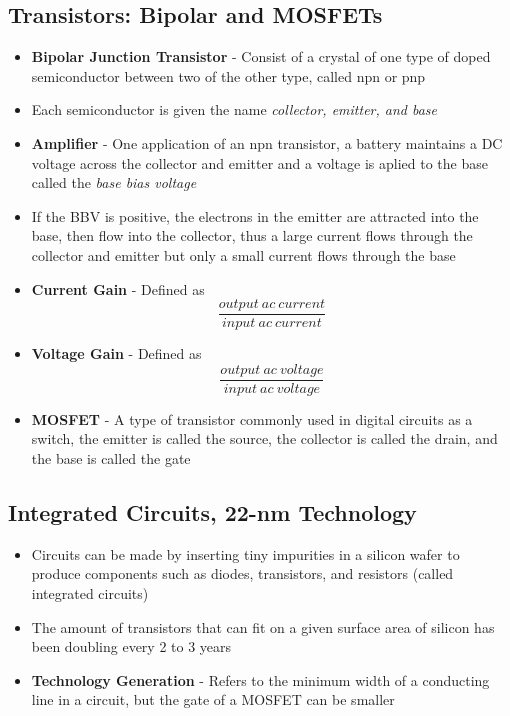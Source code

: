 \subsection{Transistors: Bipolar and MOSFETs}
\begin{itemize}
    \item \textbf{Bipolar Junction Transistor} - Consist of a crystal of one type of doped semiconductor between two of the other type, called npn or pnp
    \item Each semiconductor is given the name \emph{collector, emitter, and base}
    \item \textbf{Amplifier} - One application of an npn transistor, a battery maintains a DC voltage across the collector and emitter and a voltage is aplied to the base called the \emph{base bias voltage}
    \item If the BBV is positive, the electrons in the emitter are attracted into the base, then flow into the collector, thus a large current flows through the collector and emitter but only a small current flows through the base
    \item \textbf{Current Gain} - Defined as \[\frac{output\ ac\ current}{input\ ac\ current}\]
    \item \textbf{Voltage Gain} - Defined as \[\frac{output\ ac\ voltage}{input\ ac\ voltage}\]
    \item \textbf{MOSFET} - A type of transistor commonly used in digital circuits as a switch, the emitter is called the source, the collector is called the drain, and the base is called the gate
\end{itemize}

\subsection{Integrated Circuits, 22-nm Technology}
\begin{itemize}
    \item Circuits can be made by inserting tiny impurities in a silicon wafer to produce components such as diodes, transistors, and resistors (called integrated circuits)
    \item The amount of transistors that can fit on a given surface area of silicon has been doubling every 2 to 3 years 
    \item \textbf{Technology Generation} - Refers to the minimum width of a conducting line in a circuit, but the gate of a MOSFET can be smaller
\end{itemize}

\newpage